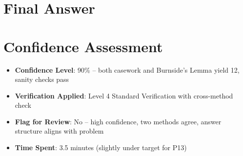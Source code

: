 \documentclass[11pt]{article}
\begin{document}
\section*{Final Answer}

\section*{Confidence Assessment}
\begin{itemize}[leftmargin=*]
    \item \textbf{Confidence Level}: 90\% -- both casework and Burnside's Lemma yield 12, sanity checks pass
    \item \textbf{Verification Applied}: Level 4 Standard Verification with cross-method check
    \item \textbf{Flag for Review}: No -- high confidence, two methods agree, answer structure aligns with problem
    \item \textbf{Time Spent}: 3.5 minutes (slightly under target for P13)
\end{itemize}
\end{document}
